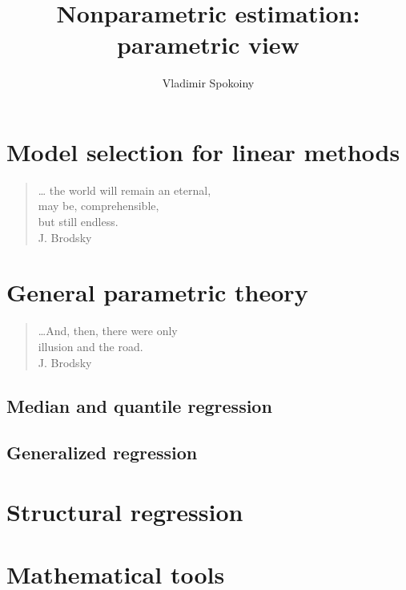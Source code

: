 \documentclass[reqno,envcountsect,11pt]{svmono}
\def\thetitle{Nonparametric estimation: parametric view}
\numberwithin{equation}{chapter}
\numberwithin{figure}{chapter}
\numberwithin{example}{section}
\numberwithin{exercise}{section}
\numberwithin{remark}{section}
\begin{document}
\author{
Vladimir Spokoiny 
}

\title{\thetitle}

\maketitle
\tableofcontents

\part{Model selection for linear methods}
\begin{quote}
\begin{flushright}                                      
\ldots 
the world will remain an eternal, 	\\
may be, comprehensible,				\\
but still endless.					\\[12pt]
J. Brodsky
\end{flushright}                                  
\end{quote}




 
 
 
 
 

\part{General parametric theory}
\begin{quote}
\begin{flushright}                                      
\ldots And, then, there were only		\\
illusion and the road.				\\[12pt]
J. Brodsky
\end{flushright}                                  
\end{quote}










\chapter{Median and quantile regression}
\chapter{Generalized regression}

\part{Structural regression}



\part{Mathematical tools}
%



\end{document}
